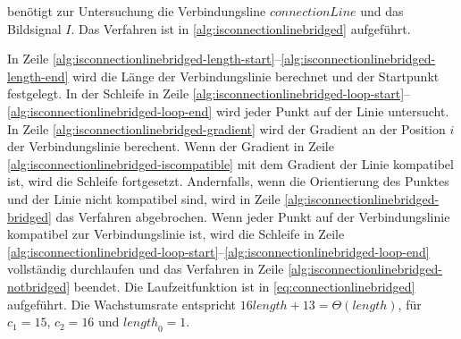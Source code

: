  benötigt zur Untersuchung die Verbindungsline $\mathit{connectionLine}$ und das
 Bildsignal $I$. Das Verfahren ist in \autoref{alg:isconnectionlinebridged} aufgeführt.

In Zeile \ref{alg:isconnectionlinebridged-length-start}--\ref{alg:isconnectionlinebridged-length-end} wird die Länge
 der Verbindungslinie berechnet und der Startpunkt festgelegt. In der Schleife in Zeile
 \ref{alg:isconnectionlinebridged-loop-start}--\ref{alg:isconnectionlinebridged-loop-end} wird jeder Punkt auf der
 Linie untersucht. In Zeile \ref{alg:isconnectionlinebridged-gradient} wird der Gradient an der Position $i$  der
 Verbindungslinie berechent. Wenn der Gradient in Zeile \ref{alg:isconnectionlinebridged-iscompatible} mit dem Gradient
 der Linie kompatibel ist, wird die Schleife fortgesetzt. Andernfalls, wenn die Orientierung des Punktes und der Linie
 nicht kompatibel sind, wird in Zeile \ref{alg:isconnectionlinebridged-bridged} das Verfahren abgebrochen. Wenn jeder
 Punkt auf der Verbindungslinie kompatibel zur Verbindungslinie ist, wird die Schleife in Zeile
 \ref{alg:isconnectionlinebridged-loop-start}--\ref{alg:isconnectionlinebridged-loop-end} vollständig durchlaufen und
 das Verfahren in Zeile \ref{alg:isconnectionlinebridged-notbridged} beendet. Die Laufzeitfunktion ist in
 \autoref{eq:connectionlinebridged} aufgeführt. Die Wachstumsrate entspricht
 $16\mathit{length} + 13 = \Theta(\mathit{length})$, für $c_{1} = 15$, $c_{2} = 16$ und $\mathit{length}_{0} = 1$.


